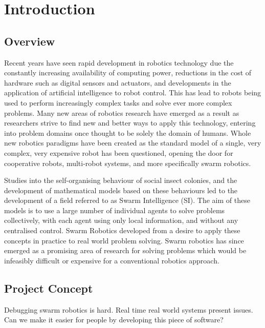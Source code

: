 
\chapter[Introduction]{Introduction} %

\label{Chapter1} %


\newcommand{\keyword}[1]{\textbf{#1}}
\newcommand{\tabhead}[1]{\textbf{#1}}
\newcommand{\code}[1]{\texttt{#1}}
\newcommand{\file}[1]{\texttt{\bfseries#1}}
\newcommand{\option}[1]{\texttt{\itshape#1}}


\section{Overview}
Recent years have seen rapid development in robotics technology due the constantly increasing availability of computing power, reductions in the cost of hardware such as digital sensors and actuators, and developments in the application of artificial intelligence to robot control. This has lead to robots being used to perform increasingly complex tasks and solve ever more complex problems. Many new areas of robotics research have emerged as a result as researchers strive to find new and better ways to apply this technology, entering into problem domains once thought to be solely the domain of humans. Whole new robotics paradigms have been created as the standard model of a single, very complex, very expensive robot has been questioned, opening the door for cooperative robots, multi-robot systems, and more specifically swarm robotics.

Studies into the self-organising behaviour of social insect colonies, and the development of mathematical models based on these behaviours  led to the development of a field referred to as Swarm Intelligence (SI). The aim of these models is to use a large number of individual agents to solve problems collectively, with each agent using only local information, and without any centralised control. Swarm Robotics developed from a desire to apply these concepts in practice to real world problem solving. Swarm robotics has since emerged as a promising area of research for solving problems which would be infeasibly difficult or expensive for a conventional robotics approach.


\section{Project Concept}
Debugging swarm robotics is hard. Real time real world systems present issues. Can we make it easier for people by developing this piece of software?
